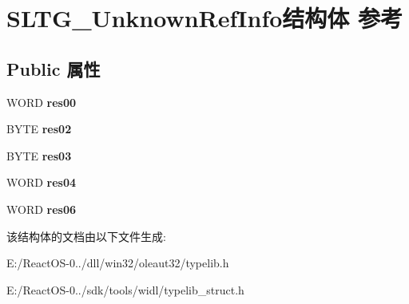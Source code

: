 \hypertarget{struct_s_l_t_g___unknown_ref_info}{}\section{S\+L\+T\+G\+\_\+\+Unknown\+Ref\+Info结构体 参考}
\label{struct_s_l_t_g___unknown_ref_info}
\subsection*{Public 属性}
\begin{DoxyCompactItemize}
\item 
\mbox{\label{struct_s_l_t_g___unknown_ref_info_a996f0d82a6680a7ba8b16c2bbc14148e}} 
W\+O\+RD {\bfseries res00}
\item 
\mbox{\label{struct_s_l_t_g___unknown_ref_info_a5937dad3369fe03bc48d6072b566b78c}} 
B\+Y\+TE {\bfseries res02}
\item 
\mbox{\label{struct_s_l_t_g___unknown_ref_info_a1ba5dce3ad9191b2f3f588716d21dbde}} 
B\+Y\+TE {\bfseries res03}
\item 
\mbox{\label{struct_s_l_t_g___unknown_ref_info_a235d51c19cf42d9b00eda658172042f4}} 
W\+O\+RD {\bfseries res04}
\item 
\mbox{\label{struct_s_l_t_g___unknown_ref_info_a07e46f7f757a0df4e0e24cd5e0e32c4f}} 
W\+O\+RD {\bfseries res06}
\end{DoxyCompactItemize}


该结构体的文档由以下文件生成\+:\begin{DoxyCompactItemize}
\item 
E\+:/\+React\+O\+S-\/0../dll/win32/oleaut32/typelib.\+h\item 
E\+:/\+React\+O\+S-\/0../sdk/tools/widl/typelib\+\_\+struct.\+h\end{DoxyCompactItemize}
